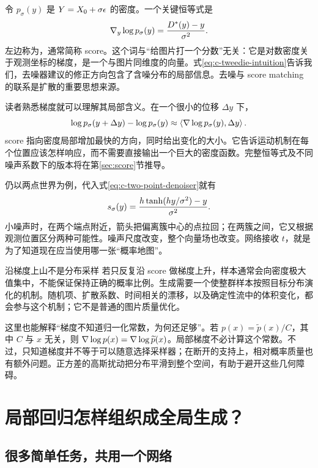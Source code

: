 令 $p_\sigma(y)$ 是 $Y=X_0+\sigma\epsilon$ 的密度。一个关键恒等式是
\begin{equation}
 \nabla_y\log p_\sigma(y)
 =\frac{D^*(y)-y}{\sigma^2}.
 \label{eq:c-tweedie-intuition}
\end{equation}
左边称为，通常简称 score。这个词与“给图片打一个分数”无关：它是对数密度关于观测坐标的梯度，是一个与图片同维度的向量。式\eqref{eq:c-tweedie-intuition}告诉我们，去噪器建议的修正方向包含了含噪分布的局部信息。去噪与 score matching 的联系是扩散的重要思想来源。\cite{c_vincent2011connection}

读者熟悉梯度就可以理解其局部含义。在一个很小的位移 $\Delta y$ 下，
\[
 \log p_\sigma(y+\Delta y)-\log p_\sigma(y)
 \approx \left\langle\nabla\log p_\sigma(y),\Delta y\right\rangle.
\]
score 指向密度局部增加最快的方向，同时给出变化的大小。它告诉运动机制在每个位置应该怎样响应，而不需要直接输出一个巨大的密度函数。完整恒等式及不同噪声系数下的版本将在第\ref{sec:score}节推导。

仍以两点世界为例，代入式\eqref{eq:c-two-point-denoiser}就有
\[
 s_\sigma(y)
 =\frac{h\tanh(hy/\sigma^2)-y}{\sigma^2}.
\]
小噪声时，在两个端点附近，箭头把偏离簇中心的点拉回；在两簇之间，它又根据观测位置区分两种可能性。噪声尺度改变，整个向量场也改变。网络接收 $t$，就是为了知道现在应当使用哪一张“概率地图”。

\begin{cautionbox}{沿梯度上山不是分布采样}
若只反复沿 score 做梯度上升，样本通常会向密度极大值集中，不能保证保持正确的概率比例。生成需要一个使整群样本按照目标分布演化的机制。随机项、扩散系数、时间相关的漂移，以及确定性流中的体积变化，都会参与这个机制；它不是普通的图片质量优化。
\end{cautionbox}

这里也能解释“梯度不知道归一化常数，为何还足够”。若 $p(x)=\widetilde p(x)/C$，其中 $C$ 与 $x$ 无关，则 $\nabla\log p(x)=\nabla\log\widetilde p(x)$。局部梯度不必计算这个常数。不过，只知道梯度并不等于可以随意选择采样器；在断开的支持上，相对概率质量也有额外问题。正方差的高斯扰动把分布平滑到整个空间，有助于避开这些几何障碍。

\section{局部回归怎样组织成全局生成？}
\label{sec:c-global}

\subsection{很多简单任务，共用一个网络}

